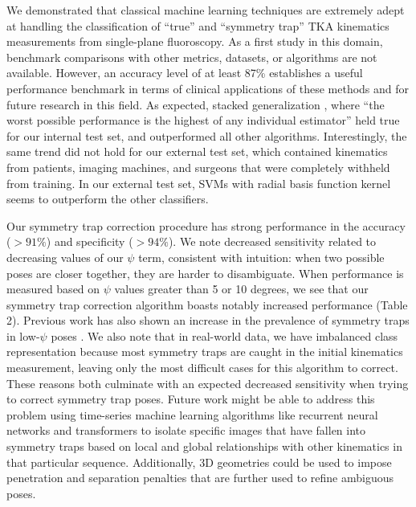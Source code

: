 {We demonstrated that classical machine learning techniques are extremely adept
at handling the classification of “true” and “symmetry trap” TKA kinematics
measurements from single-plane fluoroscopy. As a first study in this domain,
benchmark comparisons with other metrics, datasets, or algorithms are not
available. However, an accuracy level of at least 87\% establishes a useful
performance benchmark in terms of clinical applications of these methods and for
future research in this field. As expected, stacked generalization
\cite{wolpertStackedGeneralization1992,smythLinearlyCombiningDensity1999}, where
“the worst possible performance is the highest of any individual estimator” held
true for our internal test set, and outperformed all other algorithms.
Interestingly, the same trend did not hold for our external test set, which
contained kinematics from patients, imaging machines, and surgeons that were
completely withheld from training. In our external test set, SVMs with radial
basis function kernel seems to outperform the other classifiers.


Our symmetry trap correction procedure has strong performance in the accuracy
($>91\%$) and specificity ($>94\%$). We note decreased sensitivity related to
decreasing values of our $\psi$ term, consistent with intuition: when two
possible poses are closer together, they are harder to disambiguate. When
performance is measured based on $\psi$ values greater than 5 or 10 degrees, we
see that our symmetry trap correction algorithm boasts notably increased
performance (Table 2). Previous work has also shown an increase in the
prevalence of symmetry traps in low-$\psi$ poses
\cite{jensenJointTrackMachine2023}. We also note that in real-world data, we
have imbalanced class representation because most symmetry traps are caught in
the initial kinematics measurement, leaving only the most difficult cases for
this algorithm to correct. These reasons both culminate with an expected
decreased sensitivity when trying to correct symmetry trap poses. Future work
might be able to address this problem using time-series machine learning
algorithms like recurrent neural networks
\cite{hochreiterLongShortTermMemory1997} and transformers
\cite{vaswaniAttentionAllYou2017} to isolate specific images that have fallen
into symmetry traps based on local and global relationships with other
kinematics in that particular sequence. Additionally, 3D geometries could be
used to impose penetration and separation penalties that are further used to
refine ambiguous poses.


}
